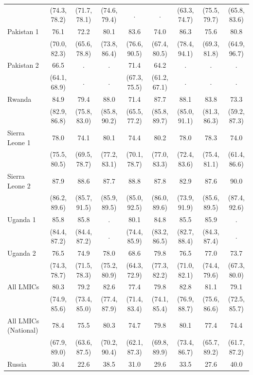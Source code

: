 \documentclass[
  12pt,
]{article}
\begin{document}
\begin{table}[!h]
{\begin{threeparttable}
\begin{tabular}[t]{lcccccccc}
 & (74.3, 78.2) & (71.7, 78.1) & (74.6, 79.4) & . & . & (63.3, 74.7) & (75.5, 79.7) & (65.8, 83.6)\\
Pakistan 1 & 76.1 & 72.2 & 80.1 & 83.6 & 74.0 & 86.3 & 75.6 & 80.8\\
 & (70.0, 82.3) & (65.6, 78.8) & (73.8, 86.4) & (76.6, 90.5) & (67.4, 80.5) & (78.4, 94.1) & (69.3, 81.8) & (64.9, 96.7)\\
Pakistan 2 & 66.5 & . & . & 71.4 & 64.2 & . & . & .\\
 & (64.1, 68.9) & . & . & (67.3, 75.5) & (61.2, 67.1) & . & . & .\\
Rwanda & 84.9 & 79.4 & 88.0 & 71.4 & 87.7 & 88.1 & 83.8 & 73.3\\
 & (82.9, 86.8) & (75.8, 83.0) & (85.8, 90.2) & (65.5, 77.2) & (85.8, 89.7) & (85.0, 91.1) & (81.3, 86.3) & (59.2, 87.3)\\
Sierra Leone 1 & 78.0 & 74.1 & 80.1 & 74.4 & 80.2 & 78.0 & 78.3 & 74.0\\
 & (75.5, 80.5) & (69.5, 78.7) & (77.2, 83.1) & (70.1, 78.7) & (77.0, 83.3) & (72.4, 83.6) & (75.4, 81.1) & (61.4, 86.6)\\
Sierra Leone 2 & 87.9 & 88.6 & 87.7 & 88.8 & 87.8 & 82.9 & 87.6 & 90.0\\
 & (86.2, 89.6) & (85.7, 91.5) & (85.9, 89.5) & (85.0, 92.5) & (86.0, 89.6) & (73.9, 91.9) & (85.6, 89.5) & (87.4, 92.6)\\
Uganda 1 & 85.8 & 85.8 & . & 80.1 & 84.8 & 85.5 & 85.9 & .\\
 & (84.4, 87.2) & (84.4, 87.2) & . & (74.4, 85.9) & (83.2, 86.5) & (82.7, 88.4) & (84.3, 87.4) & .\\
Uganda 2 & 76.5 & 74.9 & 78.0 & 68.6 & 79.8 & 76.5 & 77.0 & 73.7\\
 & (74.3, 78.7) & (71.5, 78.3) & (75.2, 80.9) & (64.3, 72.9) & (77.3, 82.2) & (71.0, 82.1) & (74.4, 79.6) & (67.3, 80.0)\\
All LMICs & 80.3 & 79.2 & 82.6 & 77.4 & 79.8 & 82.8 & 81.1 & 79.1\\
 & (74.9, 85.6) & (73.4, 85.0) & (77.4, 87.9) & (71.4, 83.4) & (74.1, 85.4) & (76.9, 88.7) & (75.6, 86.6) & (72.5, 85.7)\\
All LMICs (National) & 78.4 & 75.5 & 80.3 & 74.7 & 79.8 & 80.1 & 77.4 & 74.4\\
 & (67.9, 89.0) & (63.6, 87.5) & (70.2, 90.4) & (62.1, 87.3) & (69.8, 89.9) & (73.4, 86.7) & (65.7, 89.2) & (61.7, 87.2)\\
Russia & 30.4 & 22.6 & 38.5 & 31.0 & 29.6 & 33.5 & 27.6 & 40.0\\

\end{tabular}
\end{threeparttable}}
\end{table}
\end{document}
